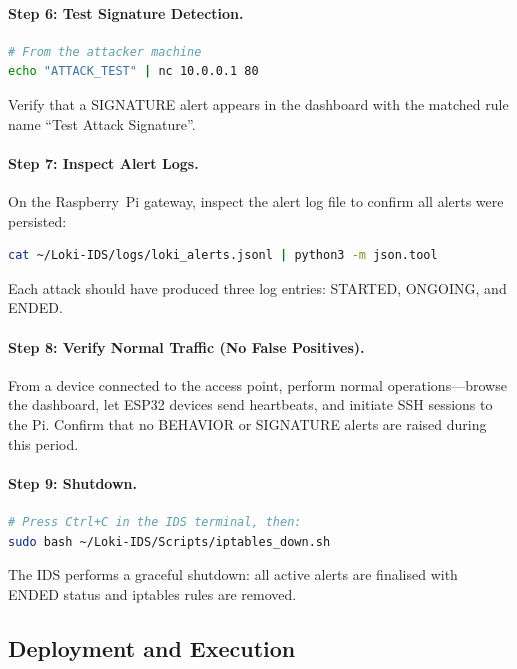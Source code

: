\documentclass[12pt,a4paper]{article}
\begin{document}
\paragraph{Step 6: Test Signature Detection.}
\begin{lstlisting}[language=bash]
# From the attacker machine
echo "ATTACK_TEST" | nc 10.0.0.1 80
\end{lstlisting}
Verify that a SIGNATURE alert appears in the dashboard with the matched rule name ``Test Attack Signature''.

\paragraph{Step 7: Inspect Alert Logs.}
On the Raspberry~Pi gateway, inspect the alert log file to confirm all alerts were persisted:
\begin{lstlisting}[language=bash]
cat ~/Loki-IDS/logs/loki_alerts.jsonl | python3 -m json.tool
\end{lstlisting}
Each attack should have produced three log entries: STARTED, ONGOING, and ENDED.

\paragraph{Step 8: Verify Normal Traffic (No False Positives).}
From a device connected to the access point, perform normal operations---browse the dashboard, let ESP32 devices send heartbeats, and initiate SSH sessions to the Pi. Confirm that no BEHAVIOR or SIGNATURE alerts are raised during this period.

\paragraph{Step 9: Shutdown.}
\begin{lstlisting}[language=bash]
# Press Ctrl+C in the IDS terminal, then:
sudo bash ~/Loki-IDS/Scripts/iptables_down.sh
\end{lstlisting}
The IDS performs a graceful shutdown: all active alerts are finalised with ENDED status and iptables rules are removed.

\subsection{Deployment and Execution}
\label{sec:deployment}
\end{document}
